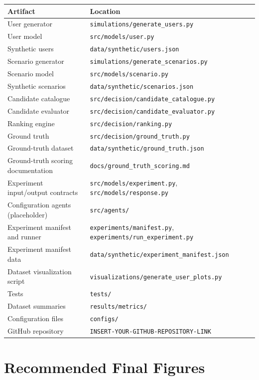 \documentclass[12pt,a4paper]{article}
\begin{document}
\begin{longtable}{p{}p{}}
\toprule
Artifact & Location\\
\midrule
User generator & \texttt{simulations/generate\_users.py}\\
User model & \texttt{src/models/user.py}\\
Synthetic users & \texttt{data/synthetic/users.json}\\
Scenario generator & \texttt{simulations/generate\_scenarios.py}\\
Scenario model & \texttt{src/models/scenario.py}\\
Synthetic scenarios & \texttt{data/synthetic/scenarios.json}\\
Candidate catalogue & \texttt{src/decision/candidate\_catalogue.py}\\
Candidate evaluator & \texttt{src/decision/candidate\_evaluator.py}\\
Ranking engine & \texttt{src/decision/ranking.py}\\
Ground truth & \texttt{src/decision/ground\_truth.py}\\
Ground-truth dataset & \texttt{data/synthetic/ground\_truth.json}\\
Ground-truth scoring documentation & \texttt{docs/ground\_truth\_scoring.md}\\
Experiment input/output contracts & \texttt{src/models/experiment.py}, \texttt{src/models/response.py}\\
Configuration agents (placeholder) & \texttt{src/agents/}\\
Experiment manifest and runner & \texttt{experiments/manifest.py}, \texttt{experiments/run\_experiment.py}\\
Experiment manifest data & \texttt{data/synthetic/experiment\_manifest.json}\\
Dataset visualization script & \texttt{visualizations/generate\_user\_plots.py}\\
Tests & \texttt{tests/}\\
Dataset summaries & \texttt{results/metrics/}\\
Configuration files & \texttt{configs/}\\
GitHub repository & \texttt{INSERT-YOUR-GITHUB-REPOSITORY-LINK}\\
\bottomrule
\end{longtable}

\section{Recommended Final Figures}
\end{document}
